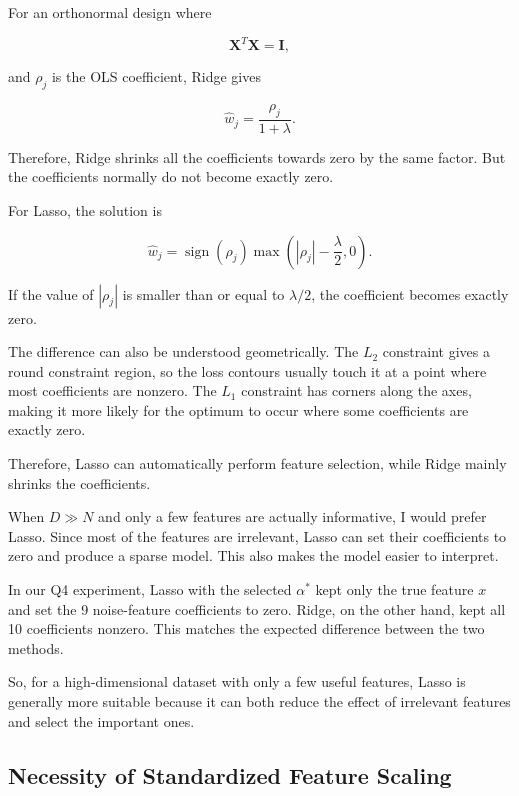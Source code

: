 \documentclass[12pt,a4paper]{article}
\begin{document}
For an orthonormal design where

\begin{equation*}
\mathbf{X}^T\mathbf{X}=\mathbf{I},
\end{equation*}

and $\rho_j$ is the OLS coefficient, Ridge gives

\begin{equation}
\hat{w}_j=\frac{\rho_j}{1+\lambda}.
\label{eq:ridgeshrink}
\end{equation}

Therefore, Ridge shrinks all the coefficients towards zero by the same factor. But the
coefficients normally do not become exactly zero.

For Lasso, the solution is

\begin{equation}
\hat{w}_j = \operatorname{sign}(\rho_j)\max\left(|\rho_j|-\frac{\lambda}{2},0\right).
\label{eq:softthresh}
\end{equation}

If the value of $|\rho_j|$ is smaller than or equal to $\lambda/2$, the coefficient becomes
exactly zero.

The difference can also be understood geometrically. The $L_2$ constraint gives a round constraint
region, so the loss contours usually touch it at a point where most coefficients are nonzero. The
$L_1$ constraint has corners along the axes, making it more likely for the optimum to occur where
some coefficients are exactly zero.

Therefore, Lasso can automatically perform feature selection, while Ridge mainly shrinks the
coefficients.

When $D \gg N$ and only a few features are actually informative, I would prefer Lasso. Since most
of the features are irrelevant, Lasso can set their coefficients to zero and produce a sparse
model. This also makes the model easier to interpret.

In our Q4 experiment, Lasso with the selected $\alpha^*$ kept only the true feature $x$ and set the
9 noise-feature coefficients to zero. Ridge, on the other hand, kept all 10 coefficients nonzero.
This matches the expected difference between the two methods.

So, for a high-dimensional dataset with only a few useful features, Lasso is generally more
suitable because it can both reduce the effect of irrelevant features and select the important
ones.

\subsection{Necessity of Standardized Feature Scaling}
\end{document}
